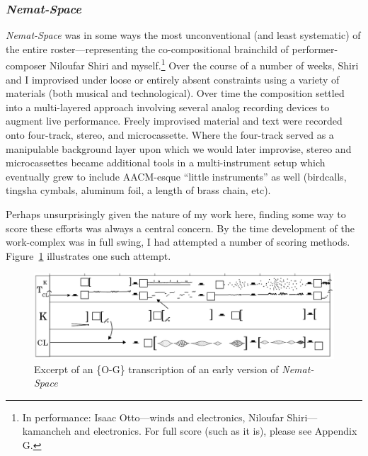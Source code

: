     \subsubsection{\textit{Nemat-Space}}

    \textit{Nemat-Space} was in some ways the most unconventional (and least systematic) of the entire roster---representing the co-compositional brainchild of performer-composer Niloufar Shiri and myself.\footnote{In performance: Isaac Otto---winds and electronics, Niloufar Shiri---kamancheh and electronics. For full score (such as it is), please see Appendix G.} Over the course of a number of weeks, Shiri and I improvised under loose or entirely absent constraints using a variety of materials (both musical and technological). Over time the composition settled into a multi-layered approach involving several analog recording devices to augment live performance. Freely improvised material and text were recorded onto four-track, stereo, and microcassette. Where the four-track served as a manipulable background layer upon which we would later improvise, stereo and microcassettes became additional tools in a multi-instrument setup which eventually grew to include AACM-esque ``little instruments'' as well (birdcalls, tingsha cymbals, aluminum foil, a length of brass chain, etc).

    Perhaps unsurprisingly given the nature of my work here, finding some way to score these efforts was always a central concern. By the time development of the work-complex was in full swing, I had attempted a number of scoring methods. Figure~\ref{fig:nemat2} illustrates one such attempt.
    
        \begin{figure}
            \centering
            \includegraphics[width=.9\textwidth]{images/chapter4/niloufar_score_long_ex.png}
            \captionsetup{width=.5\textwidth}
            \caption{Excerpt of an \{O-G\} transcription of an early version of \textit{Nemat-Space}}
            \label{fig:nemat2}
        \end{figure}

